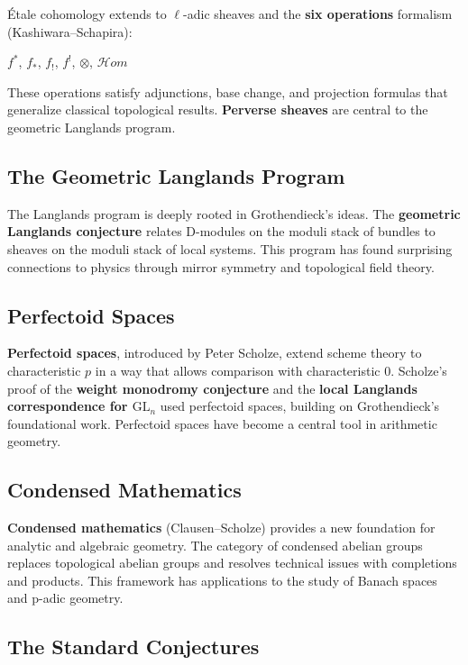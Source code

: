 Étale cohomology extends to $\ell$-adic sheaves and the \textbf{six operations}
formalism (Kashiwara--Schapira):
\begin{center}
$f^*$, $f_*$, $f_!$, $f^!$, $\otimes$, $\mathcal{H}om$
\end{center}
These operations satisfy adjunctions, base change, and projection formulas that
generalize classical topological results. \textbf{Perverse sheaves} are central
to the geometric Langlands program.

\subsection*{The Geometric Langlands Program}

The Langlands program is deeply rooted in Grothendieck's ideas. The
\textbf{geometric Langlands conjecture} relates D-modules on the moduli stack
of bundles to sheaves on the moduli stack of local systems. This program has
found surprising connections to physics through mirror symmetry and
topological field theory.

\subsection*{Perfectoid Spaces}

\textbf{Perfectoid spaces}, introduced by Peter Scholze, extend scheme theory to
characteristic $p$ in a way that allows comparison with characteristic $0$.
Scholze's proof of the \textbf{weight monodromy conjecture} and the
\textbf{local Langlands correspondence for $\mathrm{GL}_n$} used perfectoid spaces,
building on Grothendieck's foundational work. Perfectoid spaces have become a
central tool in arithmetic geometry.

\subsection*{Condensed Mathematics}

\textbf{Condensed mathematics} (Clausen--Scholze) provides a new foundation for
analytic and algebraic geometry. The category of condensed abelian groups
replaces topological abelian groups and resolves technical issues with
completions and products. This framework has applications to the study of
Banach spaces and p-adic geometry.

\subsection*{The Standard Conjectures}

